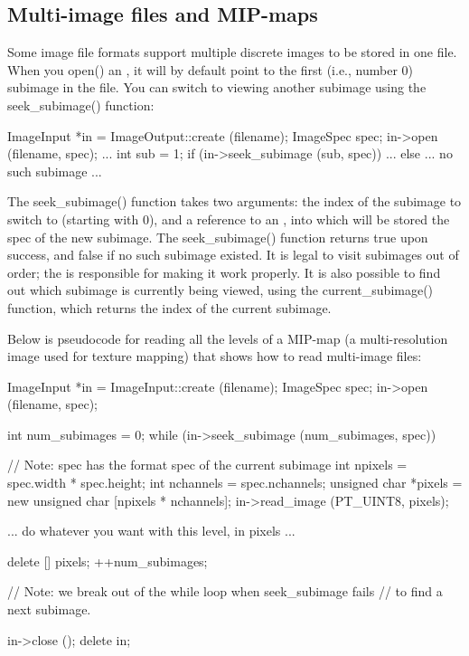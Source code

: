 \subsection{Multi-image files and MIP-maps}
\label{sec:imageinput:multiimage}

Some image file formats support multiple discrete images to be stored
in one file.  When you {\cf open()} an \ImageOutput, it will by default
point to the first (i.e., number 0) subimage in the file.  You can
switch to viewing another subimage using the {\cf seek_subimage()} 
function:

\begin{code}
        ImageInput *in = ImageOutput::create (filename);
        ImageSpec spec;
        in->open (filename, spec);
        ...
        int sub = 1;
        if (in->seek_subimage (sub, spec)) {
            ...
        } else {
            ... no such subimage ...
        }
\end{code}

The {\cf seek_subimage()} function takes two arguments: the index of the
subimage to switch to (starting with 0), and a reference to an
\ImageSpec, into which will be stored the spec of the new
subimage.  The {\cf seek_subimage()} function returns {\cf true} upon
success, and {\cf false} if no such subimage existed.  It is legal to
visit subimages out of order; the \ImageInput is responsible for making
it work properly.  It is also possible to find out which subimage is
currently being viewed, using the {\cf current_subimage()} function,
which returns the index of the current subimage.

Below is pseudocode for reading all the levels of a MIP-map (a
multi-resolution image used for texture mapping) that shows how to read
multi-image files:

\begin{code}
        ImageInput *in = ImageInput::create (filename);
        ImageSpec spec;
        in->open (filename, spec);

        int num_subimages = 0;
        while (in->seek_subimage (num_subimages, spec)) {
            // Note: spec has the format spec of the current subimage
            int npixels = spec.width * spec.height;
            int nchannels = spec.nchannels;
            unsigned char *pixels = new unsigned char [npixels * nchannels];
            in->read_image (PT_UINT8, pixels);

            ... do whatever you want with this level, in pixels ...

            delete [] pixels;
            ++num_subimages;
        }
        // Note: we break out of the while loop when seek_subimage fails
        // to find a next subimage.

        in->close ();
        delete in;
\end{code}

